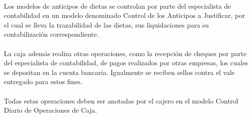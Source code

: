 \paragraph{}Los modelos de anticipos de dietas se controlan por parte del especialista de contabilidad en un modelo denominado Control de los Anticipos a Justificar, por el cual se lleva la trazabilidad de las dietas, sus liquidaciones para su contabilización correspondiente.
\paragraph{}La caja además realiza otras operaciones, como la recepción de cheques por parte del especialista de contabilidad, de pagos realizados por otras empresas, los cuales se depositan en la cuenta bancaria. Igualmente se reciben sellos contra el vale entregado para estos fines.
\paragraph{}Todas estas operaciones deben ser anotadas por el cajero en el modelo Control Diario de Operaciones de Caja.

